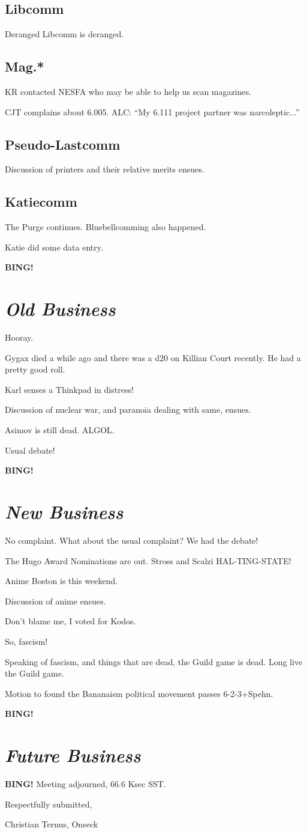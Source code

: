 \documentclass[10pt]{article}
\newcommand{\bing}{{\bf BING!} }
\newcommand{\goto}[1]{\bing \vskip 12pt \section*{{\em{#1}}}}
\begin{document}
\subsection*{Libcomm}

Deranged Libcomm is deranged.

\subsection*{Mag.*}

KR contacted NESFA who may be able to help us scan magazines.

CJT complains about 6.005.  ALC: ``My 6.111 project partner was
narcoleptic...''

\subsection*{Pseudo-Lastcomm}

Discussion of printers and their relative merits ensues.

\subsection*{Katiecomm}

The Purge continues.  Bluebellcomming also happened.

Katie did some data entry.

\goto{Old Business}

Hooray.

Gygax died a while ago and there was a d20 on Killian Court recently.
He had a pretty good roll.

Karl senses a Thinkpad in distress!

Discussion of nuclear war, and paranoia dealing with same, ensues.

Asimov is still dead.  ALGOL.

Usual debate!

\goto{New Business}

No complaint.  What about the usual complaint?  We had the debate!  

The Hugo Award Nominations are out.  Stross and Scalzi HAL-TING-STATE!

Anime Boston is this weekend.

Discussion of anime ensues.

Don't blame me, I voted for Kodos.

So, fascism!

Speaking of fascism, and things that are dead, the Guild game is dead.
Long live the Guild game.

Motion to found the Bananaism political movement passes 6-2-3+Spehn.

\goto{Future Business}

\bing
\noindent
Meeting adjourned, 66.6 Ksec SST.

\vspace{18pt}

\centerline{Respectfully submitted,}
\centerline{Christian Ternus, Onseck}
\end{document}
